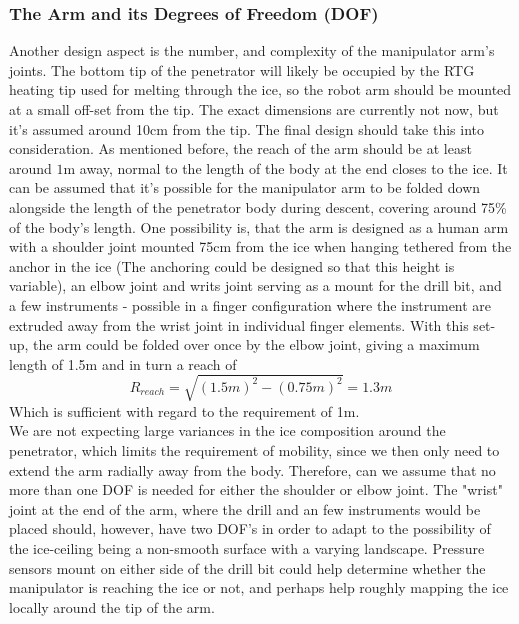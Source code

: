 \subsubsection{The Arm and its Degrees of Freedom (DOF)}
Another design aspect is the number, and complexity of the manipulator arm's joints. The bottom tip of the penetrator will likely be occupied by the RTG heating tip used for melting through the ice, so the robot arm should be mounted at a small off-set from the tip. The exact dimensions are currently not now, but it's assumed around 10cm from the tip. The final design should take this into consideration. As mentioned before, the reach of the arm should be at least around $1 \mathrm{m}$ away, normal to the length of the body at the end closes to the ice. It can be assumed that it's possible for the manipulator arm to be folded down alongside the length of the penetrator body during descent, covering around 75\% of the body's length. One possibility is, that the arm is designed as a human arm with a shoulder joint mounted 75cm from the ice when hanging tethered from the anchor in the ice (The anchoring could be designed so that this height is variable), an elbow joint and writs joint serving as a mount for the drill bit, and a few instruments - possible in a finger configuration where the instrument are extruded away from the wrist joint in individual finger elements. With this set-up, the arm could be folded over once by the elbow joint, giving a maximum length of 1.5m and in turn a reach of\\
\begin{equation}
R_{reach}=\sqrt{(1.5m)^2-(0.75m)^2}=1.3m
\end{equation}
Which is sufficient with regard to the requirement of 1m.\\
We are not expecting large variances in the ice composition around the penetrator, which limits the requirement of mobility, since we then only need to extend the arm radially away from the body. Therefore, can we assume that no more than one DOF is needed for either the shoulder or elbow joint. The "wrist" joint at the end of the arm, where the drill and an few instruments would be placed should, however, have two DOF's in order to adapt to the possibility of the ice-ceiling being a non-smooth surface with a varying landscape. Pressure sensors mount on either side of the drill bit could help determine whether the manipulator is reaching the ice or not, and perhaps help roughly mapping the ice locally around the tip of the arm.\\
